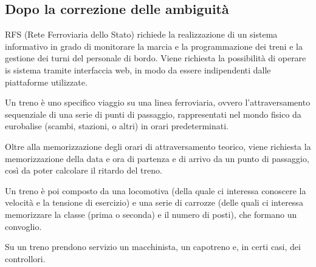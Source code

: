 \documentclass[a4paper,12pt]{report}
\begin{document}
	\subsection{Dopo la correzione delle ambiguità}
	\par RFS (Rete Ferroviaria dello Stato) richiede la realizzazione di un sistema informativo in grado di monitorare la marcia e la programmazione dei treni e la gestione dei turni del personale di bordo. Viene richiesta la possibilità di operare is sistema tramite interfaccia web, in modo da essere indipendenti dalle piattaforme utilizzate.
	\par Un treno è uno specifico viaggio su una linea ferroviaria, ovvero l'attraversamento sequenziale di una serie di punti di passaggio, rappresentati nel mondo fisico da eurobalise (scambi, stazioni, o altri) in orari predeterminati.
	\par Oltre alla memorizzazione degli orari di attraversamento teorico, viene richiesta la memorizzazione della data e ora di partenza e di arrivo da un punto di passaggio, così da poter calcolare il ritardo del treno.
	\par Un treno è poi composto da una locomotiva (della quale ci interessa conoscere la velocità e la tensione di esercizio) e una serie di carrozze (delle quali ci interessa memorizzare la classe (prima o seconda) e il numero di posti), che formano un convoglio.
	\par Su un treno prendono servizio un macchinista, un capotreno e, in certi casi, dei controllori.
\end{document}
